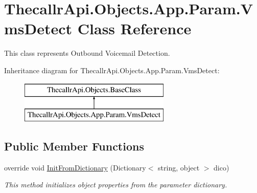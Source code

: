 \hypertarget{class_thecallr_api_1_1_objects_1_1_app_1_1_param_1_1_vms_detect}{\section{Thecallr\+Api.\+Objects.\+App.\+Param.\+Vms\+Detect Class Reference}
\label{class_thecallr_api_1_1_objects_1_1_app_1_1_param_1_1_vms_detect}
}


This class represents Outbound Voicemail Detection.  


Inheritance diagram for Thecallr\+Api.\+Objects.\+App.\+Param.\+Vms\+Detect\+:\begin{figure}[H]
\begin{center}
\leavevmode
\includegraphics[height=2.000000cm]{class_thecallr_api_1_1_objects_1_1_app_1_1_param_1_1_vms_detect}
\end{center}
\end{figure}
\subsection*{Public Member Functions}
\begin{DoxyCompactItemize}
\item 
override void \hyperlink{class_thecallr_api_1_1_objects_1_1_app_1_1_param_1_1_vms_detect_a9495a80eb8abbfcb54d6a72f61d617c4}{Init\+From\+Dictionary} (Dictionary$<$ string, object $>$ dico)
\begin{DoxyCompactList}\small\item\em This method initializes object properties from the parameter dictionary. \end{DoxyCompactList}\end{DoxyCompactItemize}
